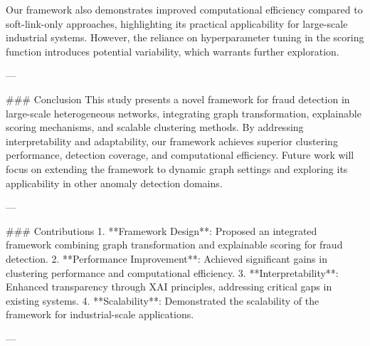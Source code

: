 Our framework also demonstrates improved computational efficiency compared to soft-link-only approaches, highlighting its practical applicability for large-scale industrial systems. However, the reliance on hyperparameter tuning in the scoring function introduces potential variability, which warrants further exploration.

---

### Conclusion  
This study presents a novel framework for fraud detection in large-scale heterogeneous networks, integrating graph transformation, explainable scoring mechanisms, and scalable clustering methods. By addressing interpretability and adaptability, our framework achieves superior clustering performance, detection coverage, and computational efficiency. Future work will focus on extending the framework to dynamic graph settings and exploring its applicability in other anomaly detection domains.

---

### Contributions  
1. **Framework Design**: Proposed an integrated framework combining graph transformation and explainable scoring for fraud detection.  
2. **Performance Improvement**: Achieved significant gains in clustering performance and computational efficiency.  
3. **Interpretability**: Enhanced transparency through XAI principles, addressing critical gaps in existing systems.  
4. **Scalability**: Demonstrated the scalability of the framework for industrial-scale applications.

---
